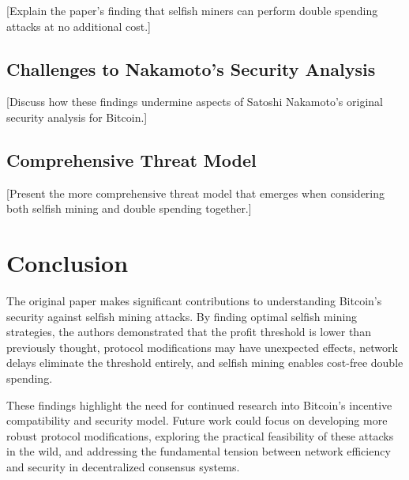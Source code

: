 \documentclass[conference]{IEEEtran}
\begin{document}
[Explain the paper's finding that selfish miners can perform double spending attacks at no additional cost.]

\subsection{Challenges to Nakamoto's Security Analysis}

[Discuss how these findings undermine aspects of Satoshi Nakamoto's original security analysis for Bitcoin.]

\subsection{Comprehensive Threat Model}

[Present the more comprehensive threat model that emerges when considering both selfish mining and double spending together.]

\section{Conclusion}

The original paper makes significant contributions to understanding Bitcoin's security against selfish mining attacks. By finding optimal selfish mining strategies, the authors demonstrated that the profit threshold is lower than previously thought, protocol modifications may have unexpected effects, network delays eliminate the threshold entirely, and selfish mining enables cost-free double spending.

These findings highlight the need for continued research into Bitcoin's incentive compatibility and security model. Future work could focus on developing more robust protocol modifications, exploring the practical feasibility of these attacks in the wild, and addressing the fundamental tension between network efficiency and security in decentralized consensus systems.



\end{document}
